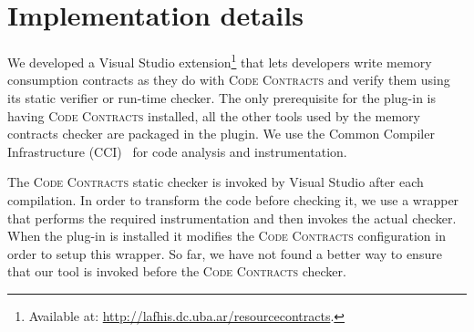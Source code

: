 \section{Implementation details} \label{sec:implementation}

% 
% 

We developed a Visual Studio extension\footnote{\small Available at: \url{http://lafhis.dc.uba.ar/resourcecontracts}.} that lets developers write memory consumption contracts as  they do with \textsc{Code Contracts} and verify them using its static verifier or run-time checker.
The only prerequisite for the plug-in is having \textsc{Code Contracts} installed, all the other tools used by the memory contracts checker are packaged in the plugin.
We use the Common Compiler Infrastructure (CCI)~\cite{CCI} for code analysis and instrumentation.

The \textsc{Code Contracts} static checker is invoked by Visual Studio after each compilation. 
In order to transform the code before checking it, we use a wrapper that performs the required instrumentation and then invokes the actual checker. When the plug-in is installed it modifies the \textsc{Code Contracts} configuration in order to setup this wrapper. So far, we have not found a better way to ensure that our tool is invoked before the \textsc{Code Contracts} checker.

